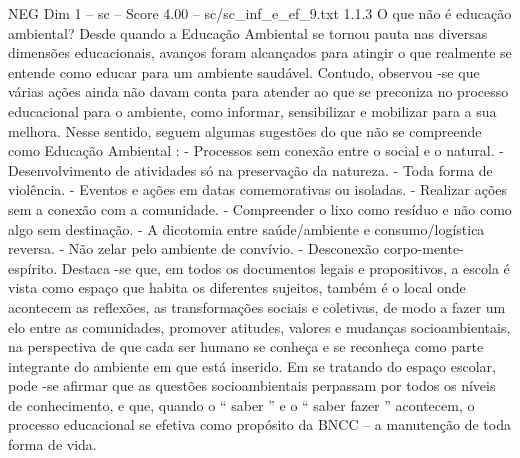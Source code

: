 \begin{textsample}{NEG Dim 1 – sc – Score 4.00 – sc/sc\_inf\_e\_ef\_9.txt}  \label{ex:f1_neg_272}
1.1.3 O que não é educação ambiental?
Desde quando a Educação Ambiental se tornou pauta nas diversas dimensões educacionais, avanços foram alcançados para atingir o que realmente se entende como educar para um ambiente saudável.
Contudo, observou -se que várias ações ainda não davam conta para atender ao que se preconiza no processo educacional para o ambiente, como informar, sensibilizar e mobilizar para a sua melhora.
Nesse sentido, seguem algumas sugestões do que não se compreende como Educação Ambiental : - Processos sem conexão entre o social e o natural. - Desenvolvimento de atividades só na preservação da natureza. - Toda forma de violência. - Eventos e ações em datas comemorativas ou isoladas. - Realizar ações sem a conexão com a comunidade. - Compreender o lixo como resíduo e não como algo sem destinação. - A dicotomia entre saúde/ambiente e consumo/logística reversa. - Não zelar pelo ambiente de convívio. - Desconexão corpo-mente-espírito.
Destaca -se que, em todos os documentos legais e propositivos, a escola é vista como espaço que habita os diferentes sujeitos, também é o local onde acontecem as reflexões, as transformações sociais e coletivas, de modo a fazer um elo entre as comunidades, promover atitudes, valores e mudanças socioambientais, na perspectiva de que cada ser humano se conheça e se reconheça como parte integrante do ambiente em que está inserido.
Em se tratando do espaço escolar, pode -se afirmar que as questões socioambientais perpassam por todos os níveis de conhecimento, e que, quando o “ saber ” e o “ saber fazer ” acontecem, o processo educacional se efetiva como propósito da BNCC – a manutenção de toda forma de vida.

\end{textsample}
